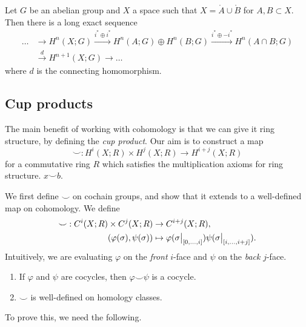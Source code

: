 \begin{theorem}
    Let $G$ be an abelian group and $X$ a space such that $X = \mathring A \cup \mathring B$ for $A, B \subset X$. Then there is a long exact sequence
    \begin{align*}
        \ldots & \to H^n(X; G) \xrightarrow{i^* \oplus i^*}
        H^n(A; G) \oplus H^n(B; G) \xrightarrow{i^* \oplus -i^*}
        H^n(A \cap B; G)                                    \\
               & \xrightarrow{d}
        H^{n+1}(X; G) \to \ldots
    \end{align*}
    where $d$ is the connecting homomorphism.
\end{theorem}

\subsection{Cup products}

The main benefit of working with cohomology is that we can give it ring structure, by defining the \emph{cup product}. Our aim is to construct a map
\[
    {\smile}: H^i(X; R) \times H^j(X; R) \to H^{i+j}(X;R)
\]
for a commutative ring $R$ which satisfies the multiplication axioms for ring structure.
$x \smile b$.

We first define ${\smile}$ on cochain groups, and show that it extends to a well-defined map on cohomology. We define
\begin{align*}
    {\smile}: C^i(X;R) \times C^j(X; R) & \to C^{i+j}(X; R), \\
    (\varphi(\sigma), \psi(\sigma))     & \mapsto
    \varphi(\restr{\sigma}{[0, \ldots, i]}) \psi(\restr{\sigma}{[i, \ldots, i+j]}).
\end{align*}
Intuitively, we are evaluating $\varphi$ on the \emph{front} $i$-face and $\psi$ on the \emph{back} $j$-face.

\begin{theorem}
    \hspace{0em}
    \begin{enumerate}
        \item If $\varphi$ and $\psi$ are cocycles, then $\varphi \smile \psi$ is a cocycle.
        \item ${\smile}$ is well-defined on homology classes.
    \end{enumerate}
\end{theorem}

To prove this, we need the following.

